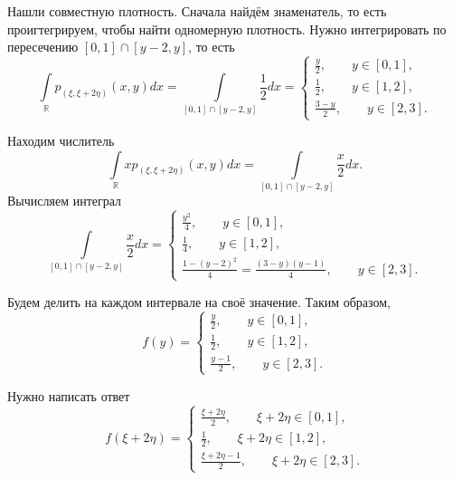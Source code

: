 \begin{enumerate}[label=\alph*)]
  Нашли совместную плотность.
  Сначала найдём знаменатель, то есть проигтегрируем, чтобы найти одномерную плотность.
  Нужно интегрировать по пересечению $ \left[ 0, 1 \right] \cap \left[ y - 2, y \right] $, то есть
  $$ \int \limits_{ \mathbb{R}} p_{ \left( \xi, \xi + 2 \eta \right) } \left( x, y \right) dx =
    \int \limits_{ \left[ 0, 1 \right] \cap \left[ y - 2, y \right] } \frac{1}{2} dx =
    \begin{cases}
      \frac{y}{2}, \qquad y \in \left[ 0, 1 \right], \\
      \frac{1}{2}, \qquad y \in \left[ 1, 2 \right], \\
      \frac{3 - y}{2}, \qquad y \in \left[ 2, 3 \right].
    \end{cases}$$

  Находим числитель
  $$ \int \limits_{ \mathbb{R}} xp_{ \left( \xi, \xi + 2 \eta \right) } \left( x, y \right) dx =
    \int \limits_{ \left[ 0, 1 \right] \cap \left[ y - 2, y \right] } \frac{x}{2} dx.$$
  Вычисляем интеграл
  $$ \int \limits_{ \left[ 0, 1 \right] \cap \left[ y - 2, y \right] } \frac{x}{2} dx =
    \begin{cases}
      \frac{y^2}{4}, \qquad y \in \left[ 0, 1 \right], \\
      \frac{1}{4}, \qquad y \in \left[ 1, 2 \right], \\
      \frac{1 - \left( y - 2 \right)^2}{4} =
      \frac{ \left( 3 - y \right) \left( y - 1 \right) }{4}, \qquad y \in \left[ 2, 3 \right].
    \end{cases}$$

  Будем делить на каждом интервале на своё значение.
  Таким образом,
  $$f \left( y \right) =
    \begin{cases}
      \frac{y}{2}, \qquad y \in \left[ 0, 1 \right], \\
      \frac{1}{2}, \qquad y \in \left[ 1, 2 \right], \\
      \frac{y - 1}{2}, \qquad y \in \left[ 2, 3 \right].
    \end{cases}$$

  Нужно написать ответ
  $$f \left( \xi + 2 \eta \right) =
    \begin{cases}
      \frac{ \xi + 2 \eta }{2}, \qquad \xi + 2 \eta \in \left[ 0, 1 \right], \\
      \frac{1}{2}, \qquad \xi + 2 \eta \in \left[ 1, 2 \right], \\
      \frac{ \xi + 2 \eta - 1}{2}, \qquad \xi + 2 \eta \in \left[ 2, 3 \right].
    \end{cases}$$
\end{enumerate}

